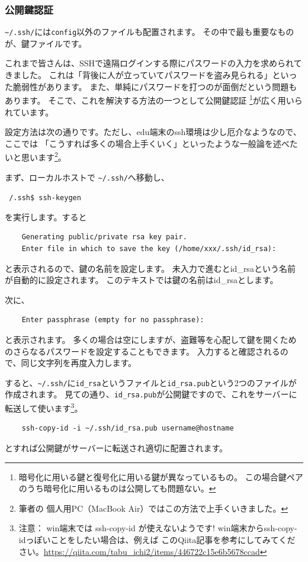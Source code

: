 \documentclass[a4j]{ltjreport}
\begin{document}
    \subsubsection{公開鍵認証}
    \verb|~/.ssh/|には\verb|config|以外のファイルも配置されます。
    その中で最も重要なものが、鍵ファイルです。

    これまで皆さんは、SSHで遠隔ログインする際にパスワードの入力を求められてきました。
    これは「背後に人が立っていてパスワードを盗み見られる」といった脆弱性があります。
    また、単純にパスワードを打つのが面倒だという問題もあります。
    そこで、これを解決する方法の一つとして公開鍵認証
    \footnote{暗号化に用いる鍵と復号化に用いる鍵が異なっているもの。
    この場合鍵ペアのうち暗号化に用いるものは公開しても問題ない。}が広く用いられています。

    設定方法は次の通りです。ただし、edu端末のssh環境は少し厄介なようなので、ここでは
    「こうすれば多くの場合上手くいく」といったような一般論を述べたいと思います\footnote{筆者の
    個人用PC（MacBook Air）ではこの方法で上手くいきました。}。

    \vspace*{3mm}

    まず、ローカルホストで \verb|~/.ssh/|へ移動し、%
    \begin{screen}
        \texttt{~/.ssh\$ ssh-keygen}
    \end{screen}
    を実行します。すると
    \begin{verbatim}
    Generating public/private rsa key pair.
    Enter file in which to save the key (/home/xxx/.ssh/id_rsa):
    \end{verbatim}
    と表示されるので、鍵の名前を設定します。
    未入力で進むとid\_rsaという名前が自動的に設定されます。
    このテキストでは鍵の名前はid\_rsaとします。

    次に、
    \begin{verbatim}
    Enter passphrase (empty for no passphrase):
    \end{verbatim}
    と表示されます。
    多くの場合は空にしますが、盗難等を心配して鍵を開くためのさらなるパスワードを設定することもできます。
    入力すると確認されるので、同じ文字列を再度入力します。

    すると、\verb|~/.ssh/|に\verb|id_rsa|というファイルと\verb|id_rsa.pub|という2つのファイルが作成されます。
    見ての通り、\verb|id_rsa.pub|が公開鍵ですので、これをサーバーに転送して使います\footnote{注意：
    win端末では ssh-copy-id が使えないようです! win端末からssh-copy-idっぽいことをしたい場合は、例えば
    このQiita記事を参考にしてみてください。\url{https://qiita.com/tabu_ichi2/items/446722c15e6b5678ccad}}。
    \begin{verbatim}
    ssh-copy-id -i ~/.ssh/id_rsa.pub username@hostname
    \end{verbatim}
    とすれば公開鍵がサーバーに転送され適切に配置されます。
\end{document}
